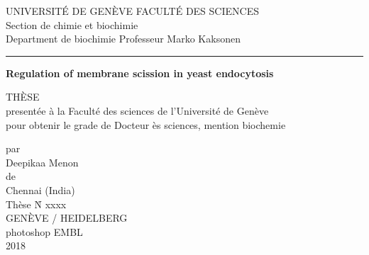 \documentclass[
12pt, %
ngerman,
english, %
onehalfspacing,
hidelinks,
headsepline, %
]{MastersDoctoralThesis} %
\newcommand\blankpage{%
	\null
	\thispagestyle{empty}%
	\newpage}
\begin{document}
	
	\frontmatter %
	
	\pagestyle{plain} %
	


%
\begin{titlepage}


\begin{normal}
	{UNIVERSIT\'E DE GEN\`EVE\hspace*{\fill} FACULT\'E DES SCIENCES\\
Section de chimie et biochimie\\
Department de biochimie\hspace*{\fill} Professeur Marko Kaksonen\\}

\vspace{-1mm}
\noindent\rule{14cm}{0.4pt}

\vspace{2.5cm}
\begin{center}
\LARGE\textbf{Regulation of membrane scission in yeast endocytosis} \\
	\vspace{1.5cm}
\end{center}

\begin{center}	
	{TH\`ESE\\
	present\'ee \`a la Facult\'e des sciences de l'Universit\'e de Gen\`eve\\
	pour obtenir le grade de Docteur \`es sciences, mention biochemie\\}

\vspace{2.5cm}
	par\\
	Deepikaa Menon\\
	de\\
	Chennai (India)\\
	\vspace{2cm}
	Th\`ese N\r{} xxxx\\
	\vspace{2cm}
	GEN\`EVE / HEIDELBERG\\
	photoshop EMBL\\	
	2018\\
	

\end{center}
	\end{normal}
\end{titlepage}
\end{document}
